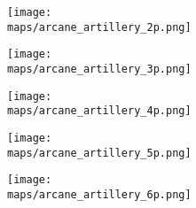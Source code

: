 \begin{multicols}{2}
\end{multicols}

\newpage

  \begin{minipage}{0.4\paperwidth}
    \centering
    \texttt{[image: \\maps/arcane\_artillery\_2p.png]}
  \end{minipage}
  \vspace{1em}
  \linebreak
  \begin{minipage}{0.4\paperwidth}
    \centering
    \texttt{[image: \\maps/arcane\_artillery\_3p.png]}
  \end{minipage}
  \begin{minipage}{0.4\paperwidth}
    \centering
    \texttt{[image: \\maps/arcane\_artillery\_4p.png]}
  \end{minipage}
  \vspace{1em}
  \linebreak
  \begin{minipage}{0.4\paperwidth}
    \centering
    \texttt{[image: \\maps/arcane\_artillery\_5p.png]}
  \end{minipage}
  \begin{minipage}{0.4\paperwidth}
    \centering
    \texttt{[image: \\maps/arcane\_artillery\_6p.png]}
  \end{minipage}
